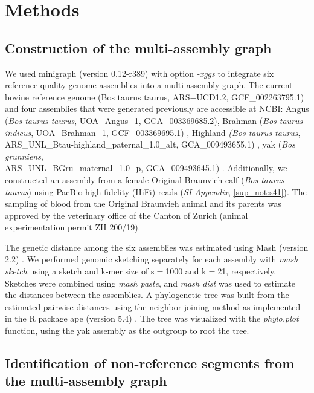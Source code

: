 \documentclass[../main.tex]{subfiles}
\begin{document}
\section{Methods}

\subsection*{Construction of the multi-assembly graph}

We used minigraph \citep{li2020design} (version 0.12-r389) with option \emph{-xggs} to integrate six reference-quality genome assemblies into a multi-assembly graph. The current bovine reference genome (Bos taurus taurus, ARS$-$UCD1.2, GCF\_002263795.1) and four assemblies that were generated previously are accessible at NCBI: Angus (\emph{Bos taurus taurus}, UOA\_Angus\_1, GCA\_003369685.2)\citep{low2020haplotype}, Brahman (\emph{Bos taurus indicus}, UOA\_Brahman\_1, GCF\_003369695.1) \citep{low2020haplotype}, Highland \emph{(Bos taurus taurus}, ARS\_UNL\_Btau-highland\_paternal\_1.0\_alt, GCA\_009493655.1) \citep{rice2020continuous}, yak (\emph{Bos grunniens}, \\ ARS\_UNL\_BGru\_maternal\_1.0\_p, GCA\_009493645.1) \citep{rice2020continuous}. Additionally, we constructed an assembly from a female Original Braunvieh calf (\emph{Bos taurus taurus}) using PacBio high-fidelity (HiFi) reads (\emph{SI Appendix}, \ref{sup_not:s41}). The sampling of blood from the Original Braunvieh animal and its parents was approved by the veterinary office of the Canton of Zurich (animal experimentation permit ZH 200/19).

The genetic distance among the six assemblies was estimated using Mash (version 2.2) \citep{ondov2016mash}. We performed genomic sketching separately for each assembly with \emph{mash sketch } using a sketch and k-mer size of s$=$1000 and k$=$21, respectively. Sketches were combined using \emph{ mash paste}, and \emph{mash dist} was used to estimate the distances between the assemblies. A phylogenetic tree was built from the estimated pairwise distances using the neighbor-joining method \citep{saitou1987neighbor} as implemented in the R package ape (version 5.4) \citep{paradis2019ape}. The tree was visualized with the \emph{phylo.plot} function, using the yak assembly as the outgroup to root the tree.

\subsection*{Identification of non-reference segments from the multi-assembly graph}
\end{document}
